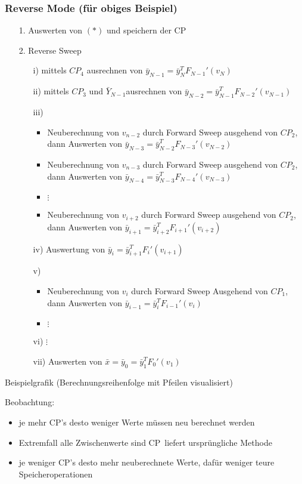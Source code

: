 \subsubsection{Reverse Mode (für obiges Beispiel)}
\begin{itemize}
	\item[1.] Auswerten von $(*)$ und speichern der CP
	\item[2.] Reverse Sweep
	\begin{itemize}
		\item[i)]  mittels $CP_4$ ausrechnen von $\bar{y}_{N-1}=\bar{y}_N^T F_{N-1}'(v_N)$
		\item[ii)] mittels $CP_3$ und $\bar{Y}_{N-1}$ausrechnen von $\bar{y}_{N-2}=\bar{y}_{N-1}^T F_{N-2}'(v_{N-1})$
		\item[iii)]
		\begin{itemize}
			\item Neuberechnung von  $v_{n-2}$ durch Forward Sweep ausgehend von $CP_2$, dann Auswerten von $\bar{y}_{N-3}=\bar{y}_{N-2}^T F_{N-3}'(v_{N-2})$
			\item Neuberechnung von  $v_{n-3}$ durch Forward Sweep ausgehend von $CP_2$, dann Auswerten von $\bar{y}_{N-4}=\bar{y}_{N-3}^T F_{N-4}'(v_{N-3})$
			\item $\vdots$
			\item Neuberechnung von  $v_{i+2}$ durch Forward Sweep ausgehend von $CP_2$, dann Auswerten von $\bar{y}_{i+1}=\bar{y}_{i+2}^T F_{i+1}'(v_{i+2})$
		\end{itemize}
		\item[iv)] Auswertung von $\bar{y}_{i}=\bar{y}_{i+1}^T F_{i}'(v_{i+1})$
		\item[v)]
		\begin{itemize}
			\item Neuberechnung von $v_i$ durch Forward Sweep Ausgehend von $CP_1$, dann Auswerten von $\bar{y}_{i-1}=\bar{y}_{i}^T F_{i-1}'(v_{i})$
			\item $\vdots$
		\end{itemize}
		\item[vi)] $\vdots$
		\item[vii)] Auswerten von $\bar{x}=\bar{y}_0=\bar{y}_1^TF_0'(v_1)$
	\end{itemize}
\end{itemize}

Beispielgrafik (Berechnungsreihenfolge mit Pfeilen visualisiert)\\
\vspace{3cm}

Beobachtung:
\begin{itemize}
	\item je mehr CP's desto weniger Werte müssen neu berechnet werden
	\item Extremfall \glqq alle Zwischenwerte sind CP\grqq\ liefert ursprüngliche Methode
	\item je weniger CP's desto mehr neuberechnete Werte, dafür weniger teure Speicheroperationen
\end{itemize}


